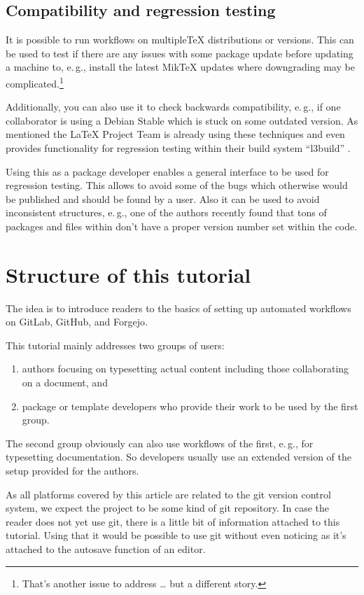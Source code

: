 \documentclass[final]{ltugboat}
\newcommand*{\TeXLive}{\acro{\TeX\,Live}\xspace}
\begin{document}
\subsection{Compatibility and regression testing}
It is possible to run workflows on multiple\TeX{} distributions or versions.
This can be used to test if there are any issues with some package update before updating a machine to, e.\,g., install the latest MikTeX updates where downgrading may be complicated.\footnote{That's another issue to address … but a different story.}

Additionally, you can also use it to check backwards compatibility, e.\,g., if one collaborator is using a Debian Stable which is stuck on some outdated version.
As mentioned the \LaTeX{} Project Team is already using these techniques and even provides functionality for regression testing within their build system \enquote{l3build} \cite{l3build}.

Using this as a package developer enables a general interface to be used for regression testing.
This allows to avoid some of the bugs which otherwise would be published and should be found by a user.
Also it can be used to avoid inconsistent structures, e.\,g., one of the authors recently found that tons of packages and files within \TeXLive{} don't have a proper version number set within the code.

\section{Structure of this tutorial}

The idea is to introduce readers to the basics of setting up automated workflows on GitLab, GitHub, and Forgejo.

This tutorial mainly addresses two groups of users:

\begin{enumerate}
\item authors focusing on typesetting actual content including those collaborating on a document, and
\item package or template developers who provide their work to be used by the first group.
\end{enumerate}

The second group obviously can also  use workflows of the first, e.\,g., for typesetting documentation.
So developers usually use an extended version of the setup provided for the authors.

As all platforms covered by this article are related to the git version control system, we expect the project to be some kind of git repository.
In case the reader does not yet use git, there is a little bit of information attached to this tutorial.
Using that it would be possible to use git without even noticing as it's attached to the autosave function of an editor.
\end{document}
